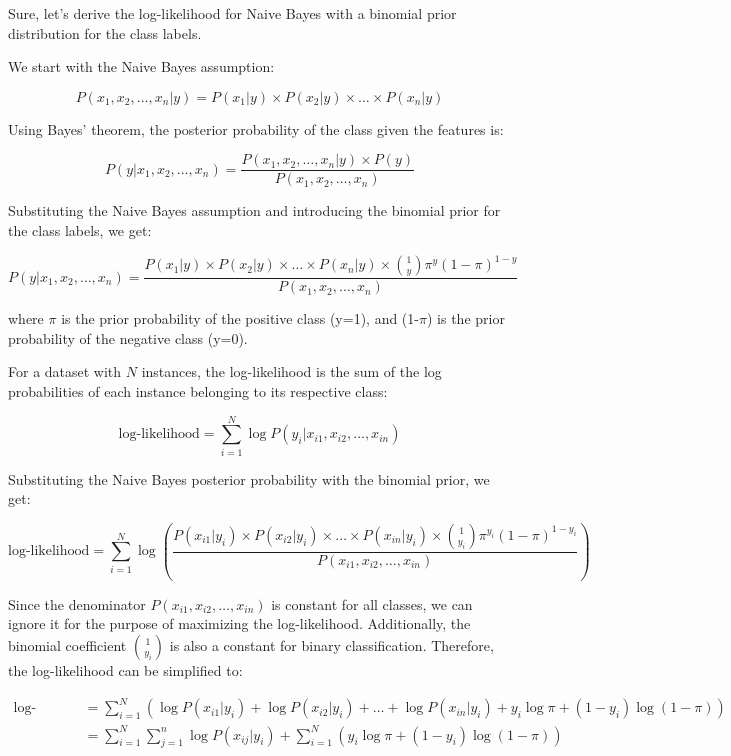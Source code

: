 \documentclass[11pt]{article}
\begin{document}
    Sure, let's derive the log-likelihood for Naive Bayes with a binomial prior distribution for the class labels.

    We start with the Naive Bayes assumption:

    $$P(x_1, x_2, \ldots, x_n | y) = P(x_1 | y) \times P(x_2 | y) \times \ldots \times P(x_n | y)$$

    Using Bayes' theorem, the posterior probability of the class given the features is:

    $$P(y | x_1, x_2, \ldots, x_n) = \frac{P(x_1, x_2, \ldots, x_n | y) \times P(y)}{P(x_1, x_2, \ldots, x_n)}$$

    Substituting the Naive Bayes assumption and introducing the binomial prior for the class labels, we get:

    $$P(y | x_1, x_2, \ldots, x_n) = \frac{P(x_1 | y) \times P(x_2 | y) \times \ldots \times P(x_n | y) \times \binom{1}{y} \pi^y (1-\pi)^{1-y}}{P(x_1, x_2, \ldots, x_n)}$$

    where $\pi$ is the prior probability of the positive class (y=1), and (1-$\pi$) is the prior probability of the negative class (y=0).

    For a dataset with $N$ instances, the log-likelihood is the sum of the log probabilities of each instance belonging to its respective class:

    $$\text{log-likelihood} = \sum_{i=1}^{N} \log P(y_i | x_{i1}, x_{i2}, \ldots, x_{in})$$

    Substituting the Naive Bayes posterior probability with the binomial prior, we get:

    $$\text{log-likelihood} = \sum_{i=1}^{N} \log \left( \frac{P(x_{i1} | y_i) \times P(x_{i2} | y_i) \times \ldots \times P(x_{in} | y_i) \times \binom{1}{y_i} \pi^{y_i} (1-\pi)^{1-y_i}}{P(x_{i1}, x_{i2}, \ldots, x_{in})} \right)$$

    Since the denominator $P(x_{i1}, x_{i2}, \ldots, x_{in})$ is constant for all classes, we can ignore it for the purpose of maximizing the log-likelihood. Additionally, the binomial coefficient $\binom{1}{y_i}$ is also a constant for binary classification. Therefore, the log-likelihood can be simplified to:

    $$\begin{align*}
          \text{log-likelihood} &= \sum_{i=1}^{N} \left( \log P(x_{i1} | y_i) + \log P(x_{i2} | y_i) + \ldots + \log P(x_{in} | y_i) + y_i \log \pi + (1-y_i) \log (1-\pi) \right) \\
          &= \sum_{i=1}^{N} \sum_{j=1}^{n} \log P(x_{ij} | y_i) + \sum_{i=1}^{N} \left( y_i \log \pi + (1-y_i) \log (1-\pi) \right)
    \end{align*}$$
\end{document}
